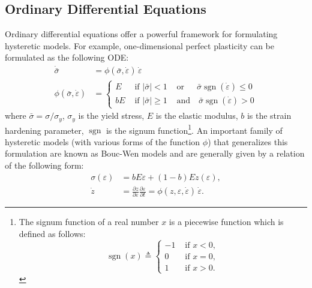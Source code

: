 \hypertarget{ordinary-differential-equations}{%
\subsection{Ordinary Differential
Equations}\label{sec:odes}}

Ordinary differential equations offer a powerful framework for
formulating hysteretic models.
For example, one-dimensional perfect plasticity can be formulated as the following ODE:
\begin{equation}
\begin{aligned}
\dot{\bar{\sigma}} &= \phi(\bar{\sigma}, \dot{\varepsilon}) \, \dot{\varepsilon}\\
\phi(\bar{\sigma}, \dot{\varepsilon})&=\left\{\begin{array}{lll}
E & \text { if } | \bar{\sigma}|<1 & \text { or } \, \, \, \, \, \, \, \bar{\sigma} \operatorname{sgn}(\dot{\varepsilon}) \leq 0 \\
bE & \text { if }|\bar{\sigma}|\geq 1 & \text { and } \, \, \, \, \bar{\sigma} \operatorname{sgn}(\dot{\varepsilon})>0
\end{array}\right.
\end{aligned}
\label{eq:ode_general}
\end{equation}
where $\bar{\sigma}=\sigma/\sigma_y$, $\sigma_y$ is the yield stress, $E$ is the elastic modulus, $b$ is the strain hardening parameter, $\operatorname{sgn}$ is the signum function{\footnote{The signum function of a real number $x$ is a piecewise function which is defined as follows:
\[
\operatorname{sgn}(x) \triangleq \left\{\begin{array}{cl}
-1 & \text { if } x<0, \\
0 & \text { if } x=0, \\
1 & \text{ if } x>0.
\end{array}
\right.
\]}}. 
An important family of hysteretic models (with various forms of the function \(\phi\)) that generalizes this formulation are known as Bouc-Wen models and are generally given by a relation of the following form:
\begin{equation}
\begin{aligned}
\sigma(\varepsilon) &= b E \varepsilon+(1-b) E z(\varepsilon),
\\
\dot{z}&=\frac{\partial z}{\partial \varepsilon} \frac{\partial \varepsilon}{\partial t} = \phi(z,\varepsilon,\dot \varepsilon) \, \dot{\varepsilon}.
\end{aligned}
\label{eq:bouc-family}
\end{equation}

